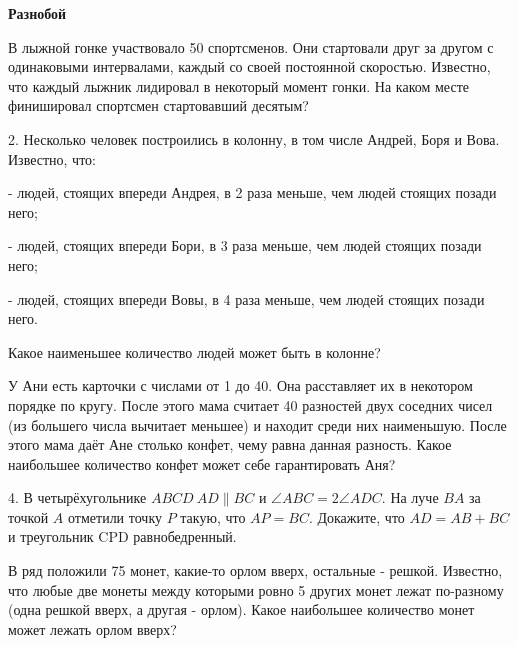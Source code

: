 \centerline{\bf \Huge Разнобой}
\centerline{\bf \Huge }

\begin{flushright}
        \scriptsize{}
\end{flushright}

В лыжной гонке участвовало 50 спортсменов. Они стартовали друг за другом с одинаковыми интервалами, каждый со своей постоянной скоростью. Известно, что каждый лыжник лидировал в некоторый момент гонки. На каком месте финишировал спортсмен стартовавший десятым?

2. Несколько человек построились в колонну, в том числе Андрей, Боря и Вова. Известно, что:

- людей, стоящих впереди Андрея, в 2 раза меньше, чем людей стоящих позади него;

- людей, стоящих впереди Бори, в 3 раза меньше, чем людей стоящих позади него;

- людей, стоящих впереди Вовы, в 4 раза меньше, чем людей стоящих позади него.

Какое наименьшее количество людей может быть в колонне?

У Ани есть карточки с числами от 1 до 40. Она расставляет их в некотором порядке по кругу. После этого мама считает 40 разностей двух соседних чисел (из большего числа вычитает меньшее) и находит среди них наименьшую. После этого мама даёт Ане столько конфет, чему равна данная разность. Какое наибольшее количество конфет может себе гарантировать Аня?

4. В четырёхугольнике $A B C D\ A D \| B C$ и $\angle A B C=2 \angle A D C$. На луче $B A$ за точкой $A$ отметили точку $P$ такую, что $A P=B C$.
Докажите, что $A D=A B+B C$ и треугольник CPD равнобедренный.

В ряд положили 75 монет, какие-то орлом вверх, остальные - решкой. Известно, что любые две монеты между которыми ровно 5 других монет лежат по-разному (одна решкой вверх, а другая - орлом). Какое наибольшее количество монет может лежать орлом вверх?